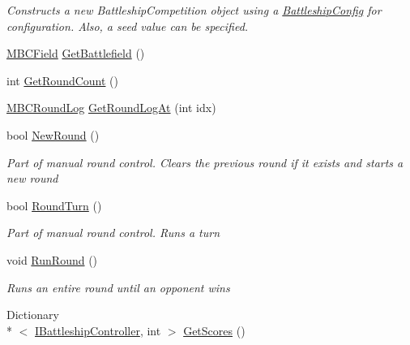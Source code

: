 \begin{DoxyCompactItemize}
\begin{DoxyCompactList}\small\item\em Constructs a new Battleship\-Competition object using a \hyperlink{class_m_b_c_core_1_1_battleship_config}{Battleship\-Config} for configuration. Also, a seed value can be specified.\end{DoxyCompactList}\item 
\hyperlink{class_m_b_c_core_1_1_m_b_c_field}{M\-B\-C\-Field} \hyperlink{class_m_b_c_core_1_1_m_b_c_competition_a3f1e62e861b217371be4e1a1f11728b2}{Get\-Battlefield} ()
\item 
int \hyperlink{class_m_b_c_core_1_1_m_b_c_competition_afea3d571a2fa23728d1c459d703622af}{Get\-Round\-Count} ()
\item 
\hyperlink{class_m_b_c_core_1_1_m_b_c_round_log}{M\-B\-C\-Round\-Log} \hyperlink{class_m_b_c_core_1_1_m_b_c_competition_aea4dae2df5c76225de7d8b9e906ba13f}{Get\-Round\-Log\-At} (int idx)
\item 
bool \hyperlink{class_m_b_c_core_1_1_m_b_c_competition_a47f16be3d85ea9e6a37eb56a90d1bfb7}{New\-Round} ()
\begin{DoxyCompactList}\small\item\em Part of manual round control. Clears the previous round if it exists and starts a new round\end{DoxyCompactList}\item 
bool \hyperlink{class_m_b_c_core_1_1_m_b_c_competition_a7049d1e4aeaae878263731cfc35421a3}{Round\-Turn} ()
\begin{DoxyCompactList}\small\item\em Part of manual round control. Runs a turn\end{DoxyCompactList}\item 
\hypertarget{class_m_b_c_core_1_1_m_b_c_competition_a34099a2d6fe279943e5baaa51551fbcb}{void \hyperlink{class_m_b_c_core_1_1_m_b_c_competition_a34099a2d6fe279943e5baaa51551fbcb}{Run\-Round} ()}\label{class_m_b_c_core_1_1_m_b_c_competition_a34099a2d6fe279943e5baaa51551fbcb}

\begin{DoxyCompactList}\small\item\em Runs an entire round until an opponent wins\end{DoxyCompactList}\item 
\hypertarget{class_m_b_c_core_1_1_m_b_c_competition_a0edd902c8c013eb553c1f4a25d448c7f}{Dictionary\\*
$<$ \hyperlink{interface_m_b_c_core_1_1_i_battleship_controller}{I\-Battleship\-Controller}, int $>$ \hyperlink{class_m_b_c_core_1_1_m_b_c_competition_a0edd902c8c013eb553c1f4a25d448c7f}{Get\-Scores} ()}\label{class_m_b_c_core_1_1_m_b_c_competition_a0edd902c8c013eb553c1f4a25d448c7f}


\end{DoxyCompactItemize}
